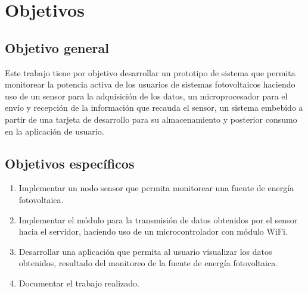
\section{Objetivos}

\subsection{Objetivo general}
Este trabajo tiene por objetivo desarrollar un prototipo de sistema que permita monitorear la potencia activa de los usuarios de sistemas fotovoltaicos haciendo uso de un sensor para la adquisición de los datos, un microprocesador para el envío y recepción de la información que recauda el sensor, un sistema embebido a partir de una tarjeta de desarrollo para su almacenamiento y posterior consumo en la aplicación de usuario.

\subsection{Objetivos específicos}
\begin{enumerate}[label=\arabic*.]
    \item Implementar un nodo sensor que permita monitorear una fuente de energía fotovoltaica.
    \item Implementar el módulo para la transmisión de datos obtenidos por el sensor hacia el servidor, haciendo uso de un microcontrolador con módulo WiFi. 
    \item Desarrollar una aplicación que permita al usuario visualizar los datos obtenidos, resultado del monitoreo de la fuente de energía fotovoltaica.
    \item Documentar el trabajo realizado.
\end{enumerate}
